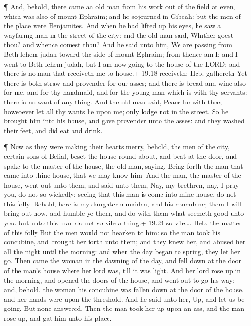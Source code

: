  ¶ And, behold, there came an old man from his work out of
the field at even, which was also of mount Ephraim; and he sojourned in
Gibeah: but the men of the place were Benjamites.  And when
he had lifted up his eyes, he saw a wayfaring man in the street of the
city: and the old man said, Whither goest thou? and whence comest thou?
 And he said unto him, We are passing from Beth-lehem-judah
toward the side of mount Ephraim; from thence am I: and I went to
Beth-lehem-judah, but I am now going to the house of the LORD; and there
is no man that receiveth me to house.+ 19.18 receiveth: Heb. gathereth
 Yet there is both straw and provender for our asses; and
there is bread and wine also for me, and for thy handmaid, and for the
young man which is with thy servants: there is no want of any thing.
 And the old man said, Peace be with thee; howsoever let
all thy wants lie upon me; only lodge not in the street. 
So he brought him into his house, and gave provender unto the asses: and
they washed their feet, and did eat and drink.

 ¶ Now as they were making their hearts merry, behold, the
men of the city, certain sons of Belial, beset the house round about,
and beat at the door, and spake to the master of the house, the old man,
saying, Bring forth the man that came into thine house, that we may know
him.  And the man, the master of the house, went out unto
them, and said unto them, Nay, my brethren, nay, I pray you, do not so
wickedly; seeing that this man is come into mine house, do not this
folly.  Behold, here is my daughter a maiden, and his
concubine; them I will bring out now, and humble ye them, and do with
them what seemeth good unto you: but unto this man do not so vile a
thing.+ 19.24 so vile\ldots: Heb. the matter of this folly 
But the men would not hearken to him: so the man took his concubine, and
brought her forth unto them; and they knew her, and abused her all the
night until the morning: and when the day began to spring, they let her
go.  Then came the woman in the dawning of the day, and
fell down at the door of the man's house where her lord was, till it was
light.  And her lord rose up in the morning, and opened the
doors of the house, and went out to go his way: and, behold, the woman
his concubine was fallen down at the door of the house, and her hands
were upon the threshold.  And he said unto her, Up, and let
us be going. But none answered. Then the man took her up upon an ass,
and the man rose up, and gat him unto his place.

